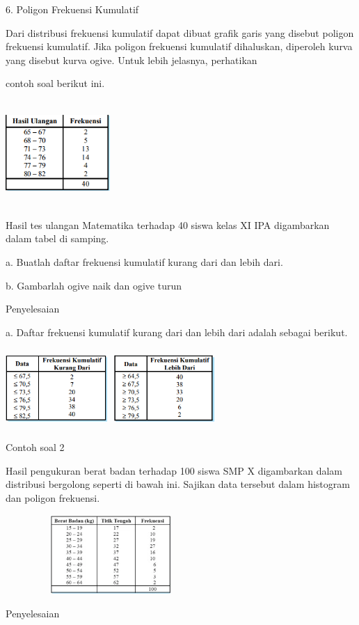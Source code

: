\documentclass[11pt,fleqn]{book} %
\begin{document}
{6. Poligon Frekuensi Kumulatif

Dari distribusi frekuensi kumulatif dapat dibuat grafik garis yang disebut poligon
frekuensi kumulatif. Jika poligon frekuensi kumulatif dihaluskan, diperoleh kurva yang
disebut kurva ogive. Untuk lebih jelasnya, perhatikan 

contoh soal berikut ini.

\includegraphics[width = 4cm, height= 4cm]{Pictures/12reska.png}

Hasil tes ulangan Matematika terhadap
40 siswa kelas XI IPA digambarkan dalam
tabel di samping.

a. Buatlah daftar frekuensi kumulatif kurang
dari dan lebih dari.

b. Gambarlah ogive naik dan ogive turun

Penyelesaian

a. Daftar frekuensi kumulatif kurang dari dan lebih dari adalah sebagai berikut.

\includegraphics[width = 8cm, height= 3cm]{Pictures/13reska.png}


Contoh soal 2

Hasil pengukuran berat badan terhadap 100 siswa SMP X digambarkan dalam distribusi bergolong seperti di bawah ini. Sajikan data tersebut dalam histogram dan poligon frekuensi.


\includegraphics[width = 8cm, height= 3cm]{Pictures/15reska.png}

Penyelesaian

}
\end{document}
